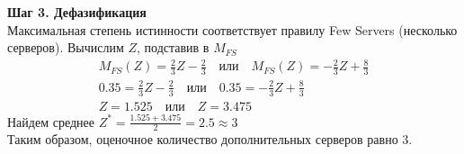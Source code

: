 \documentclass[a4paper,12pt]{article}
\begin{document}
\textbf{Шаг 3. Дефазификация}\\
Максимальная степень истинности соответствует правилу Few Servers (несколько серверов). Вычислим $Z$, подставив в $M_{FS}$
\begin{gather*}
M_{FS}(Z) = \frac{2}{3}Z-\frac{2}{3} \quad или \quad M_{FS}(Z) = -\frac{2}{3}Z + \frac{8}{3} \\
0.35 = \frac{2}{3}Z-\frac{2}{3} \quad или \quad 0.35 = -\frac{2}{3}Z + \frac{8}{3} \\
Z = 1.525 \quad или \quad Z = 3.475
\end{gather*}
Найдем среднее $Z^* = \frac{1.525+3.475}{2} = 2.5 \approx 3$ \\
Таким образом, оценочное количество дополнительных серверов равно $3$. 
\end{document}
